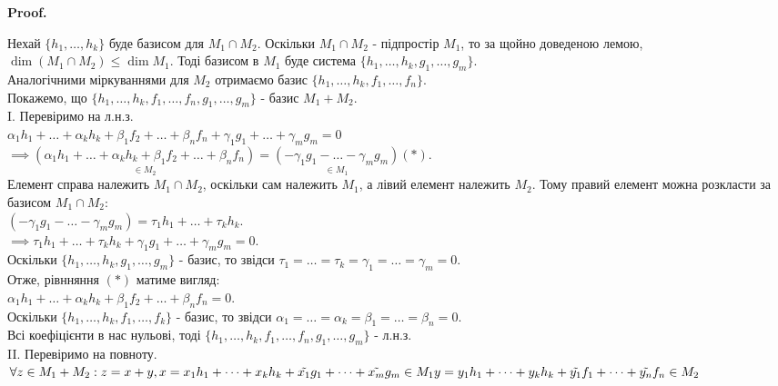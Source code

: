 \documentclass[a4paper, 10pt]{article}
\makeatletter
\theoremstyle{theoremdd}
\renewenvironment{proof}[1][Proof.\\]{\par
\pushQED{\hfill \qed}%
\normalfont \topsep6\p@\@plus6\p@\relax
\trivlist
\item\relax
{\bfseries
#1\@addpunct{.}}\hspace\labelsep\ignorespaces
}{%
\popQED\endtrivlist\@endpefalse
}
\makeatother
\begin{document}
	\begin{proof}
	Нехай $\{h_1, \dots, h_k\}$ буде базисом для $M_1 \cap M_2$. Оскільки $M_1 \cap M_2$ - підпростір $M_1$, то за щойно доведеною лемою, $\dim (M_1 \cap M_2) \leq \dim M_1$. Тоді базисом в $M_1$ буде система $\{h_1, \dots, h_k, g_1, \dots, g_m\}$.\\
	Аналогічними міркуваннями для $M_2$ отримаємо базис $\{h_1, \dots, h_k, f_1, \dots, f_n\}$.\\
	Покажемо, що $\{h_1, \dots, h_k, f_1, \dots, f_n, g_1, \dots, g_m\}$ - базис $M_1 + M_2$.
	\bigskip \\
	I. Перевіримо на л.н.з.\\
	$\alpha_1 h_1 + \dots + \alpha_k h_k + \beta_1 f_2 + \dots + \beta_n f_n + \gamma_1 g_1 + \dots + \gamma_m g_m = 0$\\
	$\implies \underset{\in M_2}{(\alpha_1 h_1 + \dots + \alpha_k h_k + \beta_1 f_2 + \dots + \beta_n f_n)} = \underset{\in M_1}{(-\gamma_1 g_1 - \dots - \gamma_m g_m)} (*)$.\\
	Елемент справа належить $M_1 \cap M_2$, оскільки сам належить $M_1$, а лівий елемент належить $M_2$. Тому правий елемент можна розкласти за базисом $M_1 \cap M_2$:\\
	$(-\gamma_1 g_1 - \dots - \gamma_m g_m) = \tau_1 h_1 + \dots + \tau_k h_k$.\\
	$\implies \tau_1 h_1 + \dots + \tau_k h_k +\gamma_1 g_1 + \dots + \gamma_m g_m = 0$.\\
	Оскільки $\{h_1, \dots, h_k, g_1, \dots, g_m\}$ - базис, то звідси $\tau_1 = \dots = \tau_k = \gamma_1 = \dots = \gamma_m = 0$.\\
	Отже, рівнняння $(*)$ матиме вигляд:\\
	$\alpha_1 h_1 + \dots + \alpha_k h_k + \beta_1 f_2 + \dots + \beta_n f_n = 0$.\\
	Оскільки $\{h_1, \dots, h_k, f_1, \dots, f_k\}$ - базис, то звідси $\alpha_1 = \dots = \alpha_k = \beta_1 = \dots = \beta_n = 0$.\\
	Всі коефіцієнти в нас нульові, тоді $\{h_1, \dots, h_k, f_1, \dots, f_n, g_1, \dots, g_m\}$ - л.н.з.
	\bigskip \\
	II. Перевіримо на повноту.\\
	$\forall z \in M_1 + M_2: z = x + y, \\x = x_1 h_1 + \dots + x_k h_k + \tilde{x_1}g_1 + \dots + \tilde{x_m}g_m \in M_1 \\ y = y_1 h_1 + \dots + y_k h_k + \tilde{y_1}f_1 + \dots + \tilde{y_n}f_n \in M_2$\\

\end{proof}
\end{document}
